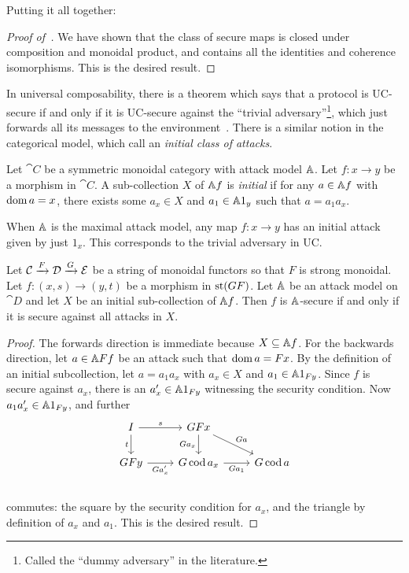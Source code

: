 Putting it all together:

\begin{proof}[Proof of~]
  We have shown that the class of secure maps is closed under composition and
  monoidal product, and contains all the identities and coherence isomorphisms.
  This is the desired result.
\end{proof}

In universal composability, there is a theorem which says that a protocol is
UC-secure if and only if it is UC-secure against the ``trivial
adversary''\footnote{Called the ``dummy adversary'' in the literature.}, which
just forwards all its messages to the environment~\cite[Claim 11]{canetti-2020}.
There is a similar notion in the categorical model, which
\cite{broadbent-karvonen-2022} call an \emph{initial class of attacks}.

\begin{dfn}
  Let $\cat{C}$ be a symmetric monoidal category with attack model $\AA$. Let
  $f: x\to y$ be a morphism in $\cat{C}$. A sub-collection $X$ of $\AA f$ is \emph{initial} if for any
  $a\in\AA f$ with $\dom a = x$, there exists some $a_x\in X$ and $a_1\in\AA
  1_y$ such that $a = a_1a_x$.
\end{dfn}

\begin{ex}
  When $\AA$ is the maximal attack model, any map $f: x\to y$ has an initial
  attack given by just $1_x$. This corresponds to the trivial adversary in UC.
\end{ex}

\begin{thm}
  Let $\cat{C}\xto{F} \cat{D}\xto{G}\cat{E}$ be a string of monoidal functors so
  that $F$ is strong monoidal. Let $f: (x, s)\to (y, t)$ be a morphism in
  $\state{GF}$. Let $\AA$ be an attack model on $\cat{D}$ and let $X$ be an
  initial sub-collection of $\AA f$. Then $f$ is $\AA$-secure if and only if it
  is secure against all attacks in $X$.
\end{thm}

\begin{proof}
  The forwards direction is immediate because $X\subseteq \AA f$. For the
  backwards direction, let $a\in \AA Ff$ be an attack such that $\dom a = Fx$.
  By the definition of an initial subcollection, let $a = a_1a_x$ with $a_x\in
  X$ and $a_1\in \AA 1_{Fy}$. Since $f$ is secure against $a_x$, there is an
  $a_x'\in \AA 1_{Fy}$ witnessing the security condition. Now $a_1a_x'\in\AA
  1_{Fy}$, and further \[
    \begin{tikzcd}
      I\ar[r, "s"]\ar[d, "t"'] & GFx\ar[d, "Ga_x"']\ar[dr, "Ga"]\\
      GFy\ar[r, "Ga_x'"'] & G\cod a_x\ar[r, "Ga_1"'] & G\cod a \\
    \end{tikzcd}
  \] commutes: the square by the security condition for $a_x$, and the triangle
  by definition of $a_x$ and $a_1$. This is the desired result.
\end{proof}

